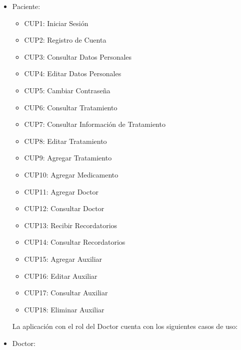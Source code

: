 \begin{itemize}
	\item Paciente:
	\begin{itemize}
		\item CUP1: Iniciar Sesión
		\item CUP2: Registro de Cuenta
		\item CUP3: Consultar Datos Personales
		\item CUP4: Editar Datos Personales
		\item CUP5: Cambiar Contraseña
		\item CUP6: Consultar Tratamiento
		\item CUP7: Consultar Información de Tratamiento
		\item CUP8: Editar Tratamiento
		\item CUP9: Agregar Tratamiento
		\item CUP10: Agregar Medicamento
		\item CUP11: Agregar Doctor
		\item CUP12: Consultar Doctor
		\item CUP13: Recibir Recordatorios
		\item CUP14: Consultar Recordatorios
		\item CUP15: Agregar Auxiliar
		\item CUP16: Editar Auxiliar
		\item CUP17: Consultar Auxiliar
		\item CUP18: Eliminar Auxiliar
	\end{itemize}

	
La aplicación con el rol del Doctor cuenta con los siguientes casos de uso:	 
	
		\item Doctor:
	\begin{itemize}
		

\end{itemize}
\end{itemize}
